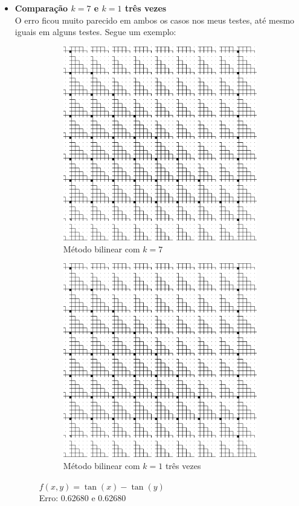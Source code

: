 \documentclass[leqno]{article}
\begin{document}
\begin{itemize}
    \item \textbf{Comparação $k = 7$ e $k = 1$ três vezes} \\
        O erro ficou muito parecido em ambos os casos nos meus testes, até mesmo
        iguais em alguns testes. Segue um exemplo:

        \begin{figure}[H]
            \centering
            \begin{subfigure}{.45\textwidth}
              \centering
              \includegraphics[width=.7\linewidth]{../images/func_2_k7x1_bil.png}
              \caption{Método bilinear com $k = 7$}
              \label{fig:sub2}
            \end{subfigure}
            \begin{subfigure}{.45\textwidth}
                \centering
                \includegraphics[width=.7\linewidth]{../images/func_2_k1x3_bil.png}
                \caption{Método bilinear com $k = 1$ três vezes}
                \label{fig:sub1}
              \end{subfigure}%
            \caption{$f(x,y) = \tan(x) - \tan(y)$ \\ Erro: 0.62680 e 0.62680}
            \label{fig:test}
        \end{figure}
\end{itemize}
\end{document}
